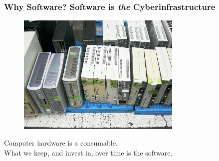 \begin{frame}
\frametitle{Why Software? Software is {\em the} Cyberinfrastructure}

\begin{figure}[htbp]
\begin{center}
\includegraphics[width=0.7\textwidth]{images/Junk_desktop_personal_computer.jpg}
\end{center}
\end{figure}

\begin{center}
\small{Computer hardware is a consumable. \\ What we keep, and invest in, over 
time is the software.}
\end{center}

\end{frame}


